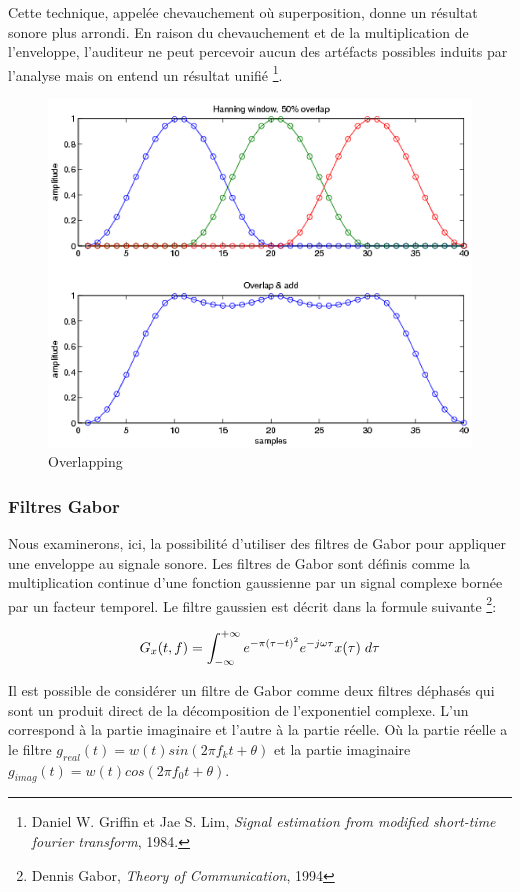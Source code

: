 Cette technique, appelée chevauchement où superposition, donne un résultat sonore plus arrondi. En raison du chevauchement et de la multiplication de l'enveloppe, l'auditeur ne peut percevoir aucun des artéfacts possibles induits par l'analyse mais on entend un résultat unifié \footnote {Daniel W. Griffin et Jae S. Lim, \textit{Signal estimation from modified short-time fourier transform}, 1984. \nocite{GrL84}}. 
 
         \begin{figure}
            \centering
            \includegraphics[width = 0.5 \textwidth ]{Graphs/Overlapping.png}
            \caption{Overlapping}
            \label{overlapping}
        \end{figure}

\subsubsection{Filtres Gabor}

Nous examinerons, ici, la possibilité d’utiliser des filtres de Gabor pour appliquer une enveloppe au signale sonore. Les filtres de Gabor sont définis comme la multiplication continue d'une fonction gaussienne par un signal complexe bornée par un facteur temporel. Le filtre gaussien est décrit dans la formule suivante \footnote{Dennis Gabor, \textit{Theory of Communication}, 1994 \nocite{Gab44}}:

\begin{equation}
    G_x(t,f) = \int_{-\infty}^{+\infty} e ^ {-\pi(\tau-t)^2} e ^ {-j\omega \tau} x(\tau)\hspace{1mm} d\tau  
\end{equation}

Il est possible de considérer un filtre de Gabor comme deux filtres déphasés qui sont un produit direct de la décomposition de l'exponentiel complexe. L'un correspond à la partie imaginaire et l'autre à la partie réelle. Où la partie réelle a le filtre $ g_{real} (t) = w (t) sin (2 \pi f_k t + \theta) $ et la partie imaginaire $ g_{imag} (t) = w (t) cos (2 \pi f_0 t + \theta) $.

